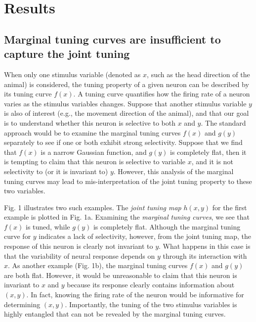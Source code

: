 \documentclass[11pt]{article}
\begin{document}
\section{Results}

\subsection{Marginal tuning curves are insufficient to capture the joint tuning}

When only one stimulus variable (denoted as $x$, such as the head direction of the animal) is considered, the tuning property of a given neuron can be described by its tuning curve $f(x)$. A tuning curve quantifies how the firing rate of a neuron varies as the stimulus variables changes.
Suppose that another stimulus variable $y$ is also of interest (e.g., the movement direction of the animal),
and that our goal is to understand whether this neuron is selective to both $x$ and $y$. The standard approach would be to examine the marginal tuning curves $f(x)$ and $g(y)$ separately to see if one or both exhibit strong selectivity. Suppose that we find that $f(x)$ is a narrow Gaussian function, and $g(y)$ is completely flat, then it is tempting to claim that this neuron is selective to variable $x$, and it is not selectivity to (or it is invariant to) $y$. However, this analysis of the marginal tuning curves may lead to mis-interpretation of the joint tuning property to these two variables.  

Fig. 1 illustrates two such examples. The \textit{joint tuning map} $h(x,y)$ for the first example is plotted in Fig. 1a. Examining the \textit{marginal tuning curves}, we see that $f(x)$ is tuned, while $g(y)$ is completely flat.
Although the marginal tuning curve for $y$ indicates a lack of selectivity, however, from the joint tuning map, the response of this neuron is clearly not invariant to $y$. What happens in this case is that the variability of neural response depends on $y$ through its interaction with $x$.
As another example (Fig. 1b), the marginal tuning curves $f(x)$ and $g(y)$ are both flat. However, it would be unreasonable to claim that this neuron is invariant to $x$ and $y$ because its response clearly contains information about $(x,y)$. In fact, knowing the firing rate of the neuron would be informative for determining $(x, y)$. 
Importantly, the tuning of the two stimulus variables is highly entangled that can not be revealed by the marginal tuning curves. 
\end{document}
